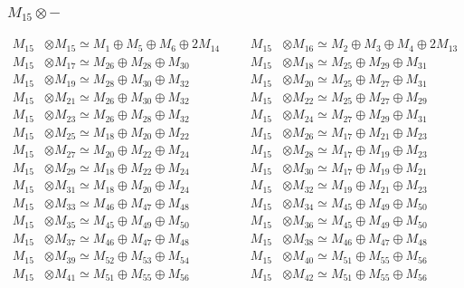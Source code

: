 \subsubsection{$ M_{15}\otimes -$}
\begin{align*}
M_{15} &\otimes M_{15} \simeq M_{1} \oplus M_{5} \oplus M_{6} \oplus 2M_{14} &&& M_{15} &\otimes M_{16} \simeq M_{2} \oplus M_{3} \oplus M_{4} \oplus 2M_{13}\\
M_{15} &\otimes M_{17} \simeq M_{26} \oplus M_{28} \oplus M_{30} &&& M_{15} &\otimes M_{18} \simeq M_{25} \oplus M_{29} \oplus M_{31}\\
M_{15} &\otimes M_{19} \simeq M_{28} \oplus M_{30} \oplus M_{32} &&& M_{15} &\otimes M_{20} \simeq M_{25} \oplus M_{27} \oplus M_{31}\\
M_{15} &\otimes M_{21} \simeq M_{26} \oplus M_{30} \oplus M_{32} &&& M_{15} &\otimes M_{22} \simeq M_{25} \oplus M_{27} \oplus M_{29}\\
M_{15} &\otimes M_{23} \simeq M_{26} \oplus M_{28} \oplus M_{32} &&& M_{15} &\otimes M_{24} \simeq M_{27} \oplus M_{29} \oplus M_{31}\\
M_{15} &\otimes M_{25} \simeq M_{18} \oplus M_{20} \oplus M_{22} &&& M_{15} &\otimes M_{26} \simeq M_{17} \oplus M_{21} \oplus M_{23}\\
M_{15} &\otimes M_{27} \simeq M_{20} \oplus M_{22} \oplus M_{24} &&& M_{15} &\otimes M_{28} \simeq M_{17} \oplus M_{19} \oplus M_{23}\\
M_{15} &\otimes M_{29} \simeq M_{18} \oplus M_{22} \oplus M_{24} &&& M_{15} &\otimes M_{30} \simeq M_{17} \oplus M_{19} \oplus M_{21}\\
M_{15} &\otimes M_{31} \simeq M_{18} \oplus M_{20} \oplus M_{24} &&& M_{15} &\otimes M_{32} \simeq M_{19} \oplus M_{21} \oplus M_{23}\\
M_{15} &\otimes M_{33} \simeq M_{46} \oplus M_{47} \oplus M_{48} &&& M_{15} &\otimes M_{34} \simeq M_{45} \oplus M_{49} \oplus M_{50}\\
M_{15} &\otimes M_{35} \simeq M_{45} \oplus M_{49} \oplus M_{50} &&& M_{15} &\otimes M_{36} \simeq M_{45} \oplus M_{49} \oplus M_{50}\\
M_{15} &\otimes M_{37} \simeq M_{46} \oplus M_{47} \oplus M_{48} &&& M_{15} &\otimes M_{38} \simeq M_{46} \oplus M_{47} \oplus M_{48}\\
M_{15} &\otimes M_{39} \simeq M_{52} \oplus M_{53} \oplus M_{54} &&& M_{15} &\otimes M_{40} \simeq M_{51} \oplus M_{55} \oplus M_{56}\\
M_{15} &\otimes M_{41} \simeq M_{51} \oplus M_{55} \oplus M_{56} &&& M_{15} &\otimes M_{42} \simeq M_{51} \oplus M_{55} \oplus M_{56}\\

\end{align*}

